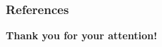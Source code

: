 \documentclass{presentation}
\begin{document}






\appendix

\begin{frame}
  \frametitle{References}
  \printbibliography[title={References}]
 \end{frame}

\begin{xtitle}

\vspace{2.0cm}
{\bf Thank you for your attention!}\\

\end{xtitle}

 
\end{document}
